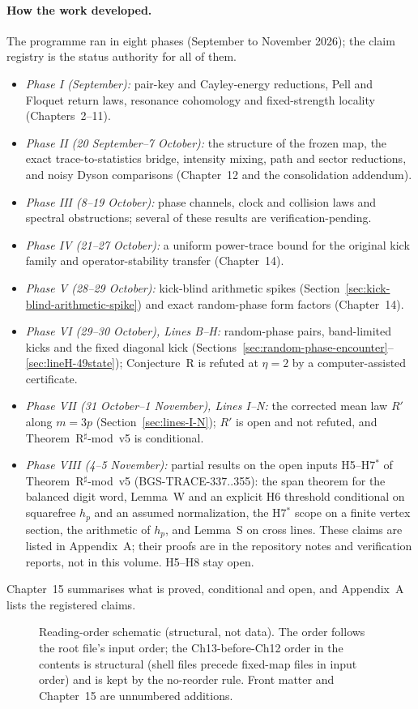 \paragraph{How the work developed.} The programme ran in eight phases
(September to November 2026); the claim registry
 is the status authority for all of them.
\begin{itemize}
\item \emph{Phase I (September):} pair-key and Cayley-energy reductions,
Pell and Floquet return laws, resonance cohomology and fixed-strength
locality (Chapters~2--11).
\item \emph{Phase II (20 September--7 October):} the structure of the
frozen map, the exact trace-to-statistics bridge, intensity mixing,
path and sector reductions, and noisy Dyson comparisons (Chapter~12 and
the consolidation addendum).
\item \emph{Phase III (8--19 October):} phase channels, clock and
collision laws and spectral obstructions; several of these results are
verification-pending.
\item \emph{Phase IV (21--27 October):} a uniform power-trace bound for the
original kick family and operator-stability transfer (Chapter~14).
\item \emph{Phase V (28--29 October):} kick-blind arithmetic spikes
(Section~\ref{sec:kick-blind-arithmetic-spike}) and exact random-phase
form factors (Chapter~14).
\item \emph{Phase VI (29--30 October), Lines B--H:} random-phase pairs,
band-limited kicks and the fixed diagonal kick
(Sections~\ref{sec:random-phase-encounter}--\ref{sec:lineH-49state});
Conjecture~R is refuted at $\eta=2$ by a computer-assisted certificate.
\item \emph{Phase VII (31 October--1 November), Lines I--N:} the corrected
mean law $R'$ along $m=3p$ (Section~\ref{sec:lines-I-N}); $R'$ is open and
not refuted, and Theorem~R$^\sharp$-mod~v5 is conditional.
\item \emph{Phase VIII (4--5 November):} partial results on the open
inputs H5--H7$^*$ of Theorem~R$^\sharp$-mod~v5 (BGS-TRACE-337..355): the
span theorem for the balanced digit word, Lemma~W and an explicit H6
threshold conditional on squarefree $h_p$ and an assumed normalization, the H7$^*$ scope on a
finite vertex section, the arithmetic of $h_p$, and Lemma~S on cross
lines. These claims are listed in Appendix~A; their proofs are in the
repository notes and verification reports, not in this volume. H5--H8
stay open.
\end{itemize}
Chapter~15 summarises what is proved, conditional and open, and
Appendix~A lists the registered claims.

\begin{figure}[htbp]
\centering

\caption{Reading-order schematic (structural, not data). The order follows
the root file's input order; the
Ch13-before-Ch12 order in the contents is structural (shell files precede
fixed-map files in input order) and is kept by the no-reorder rule.
Front matter and Chapter~15 are unnumbered additions.}
\end{figure}
